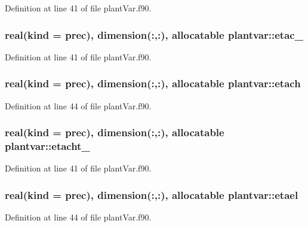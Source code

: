 Definition at line 41 of file plant\-Var.\-f90.

\hypertarget{classplantvar_ab3e228857f49d79572bc7071e650ae33}{
\subsubsection[{etac\-\_\-}]{\setlength{\rightskip}{0pt plus 5cm}real(kind = prec), dimension(\-:,\-:), allocatable plantvar\-::etac\-\_\-}}\label{classplantvar_ab3e228857f49d79572bc7071e650ae33}


Definition at line 41 of file plant\-Var.\-f90.

\hypertarget{classplantvar_a1bae392336fb8d7f0376c7e98163003e}{
\subsubsection[{etach}]{\setlength{\rightskip}{0pt plus 5cm}real(kind = prec), dimension(\-:,\-:), allocatable plantvar\-::etach}}\label{classplantvar_a1bae392336fb8d7f0376c7e98163003e}


Definition at line 44 of file plant\-Var.\-f90.

\hypertarget{classplantvar_a1bfe35beb70f107ed930740d7ce7189a}{
\subsubsection[{etacht\-\_\-}]{\setlength{\rightskip}{0pt plus 5cm}real(kind = prec), dimension(\-:,\-:), allocatable plantvar\-::etacht\-\_\-}}\label{classplantvar_a1bfe35beb70f107ed930740d7ce7189a}


Definition at line 41 of file plant\-Var.\-f90.

\hypertarget{classplantvar_a1a1a32a309c970c5ccccda52cbc92e36}{
\subsubsection[{etael}]{\setlength{\rightskip}{0pt plus 5cm}real(kind = prec), dimension(\-:,\-:), allocatable plantvar\-::etael}}\label{classplantvar_a1a1a32a309c970c5ccccda52cbc92e36}


Definition at line 44 of file plant\-Var.\-f90.

